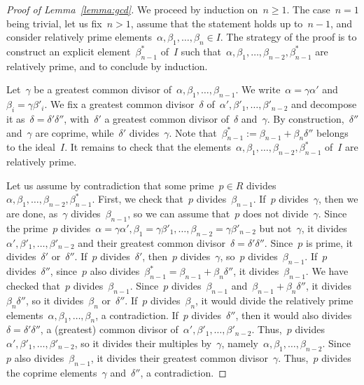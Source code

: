 \documentclass[10.9pt,a4paper]{amsart}
\theoremstyle{definition}
\theoremstyle{remark}
\begin{document}
\begin{proof}[Proof of Lemma~\ref{lemma:gcd}]
We proceed by induction on~$n\ge 1$. The case~$n=1$ being trivial, let us fix~$n>1$, assume that the statement holds up to~$n-1$, and consider relatively prime elements~$\alpha,\beta_1,\dots,\beta_n\in I$.
The strategy of the proof is to construct an explicit element~$\beta^*_{n-1}$ of~$I$ such that~$\alpha,\beta_1, \ldots, \beta_{n-2},\beta^*_{n-1}$ are relatively prime, and to conclude by induction.

Let~$\gamma$ be a greatest common divisor of~$\alpha,\beta_1,\ldots, \beta_{n-1}$. We write~$\alpha = \gamma\alpha'$ and~$\beta_i = \gamma\beta'_i$. We fix a greatest common divisor~$\delta$ of~$\alpha',\beta'_1, \ldots, \beta'_{n-2}$  and decompose it as~$\delta = \delta'\delta''$, with~$\delta'$ a greatest common divisor of~$\delta$ and~$\gamma$. By construction,~$\delta''$ and~$\gamma$ are coprime, while~$\delta'$ divides~$\gamma$. Note that~$\beta^*_{n-1}:=\beta_{n-1}+\beta_n\delta''$ belongs to the ideal~$I$.
It remains to check that the elements~$\alpha,\beta_1, \ldots, \beta_{n-2},\beta^*_{n-1}$ of~$I$ are relatively prime.

Let us assume by contradiction that some prime~$p\in R$ divides~$\alpha,\beta_1, \ldots, \beta_{n-2},\beta^*_{n-1}$.
First, we check that~$p$ divides~$\beta_{n-1}$. If~$p$ divides~$\gamma$, then we are done, as~$\gamma$ divides~$\beta_{n-1}$,
so we can assume that~$p$ does not divide~$\gamma$. Since the prime~$p$ divides~$\alpha=\gamma\alpha',\beta_1=\gamma\beta'_{1}, \ldots, \beta_{n-2}=\gamma\beta'_{n-2}$ but not~$\gamma$, it divides~$\alpha',\beta'_{1}, \ldots, \beta'_{n-2}$ and their greatest common divisor~$\delta = \delta' \delta''$.
Since~$p$ is prime, it divides~$\delta'$ or~$\delta''$. If~$p$ divides~$\delta'$, then~$p$ divides~$\gamma$, so~$p$ divides~$\beta_{n-1}$. If~$p$ divides~$\delta''$, since~$p$ also divides~$\beta^*_{n-1}=\beta_{n-1}+\beta_n \delta''$, it divides~$\beta_{n-1}$.
We have checked that~$p$ divides~$\beta_{n-1}$.
Since~$p$ divides~$\beta_{n-1}$ and~$\beta_{n-1}+\beta_n \delta''$, it divides~$\beta_n \delta''$, so  it divides~$\beta_n$ or~$\delta''$. If~$p$ divides~$\beta_n$, it would divide the relatively prime elements~$\alpha,\beta_1, \ldots, \beta_{n}$, a contradiction.
If~$p$ divides~$\delta''$, then it would also divides~$\delta=\delta'\delta''$, a (greatest) common divisor of~$\alpha',\beta'_1, \ldots, \beta'_{n-2}$. Thus,~$p$ divides~$\alpha',\beta'_1, \ldots, \beta'_{n-2}$, so it divides their multiples by~$\gamma$,
namely~$\alpha,\beta_1, \ldots, \beta_{n-2}$. Since~$p$ also divides~$\beta_{n-1}$, it divides their greatest common divisor~$\gamma$. Thus,~$p$ divides the coprime elements~$\gamma$ and~$\delta''$, a contradiction.
\end{proof}
\end{document}
